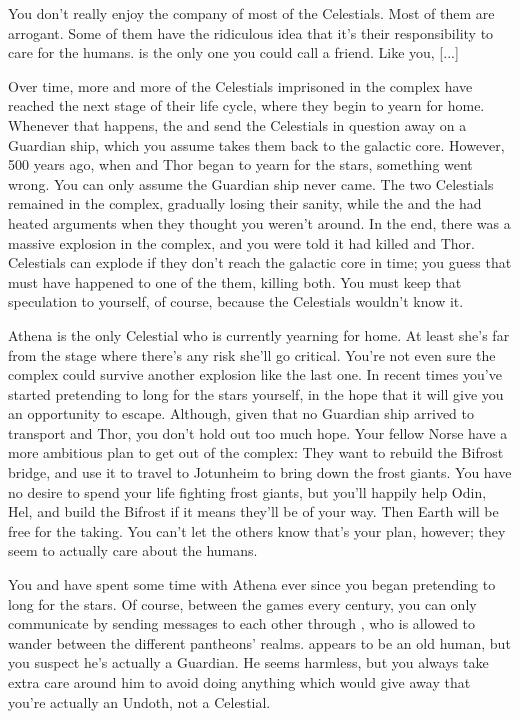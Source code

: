 \documentclass[char]{guardians}
\begin{document}
You don't really enjoy the company of most of the Celestials. Most of them are arrogant. Some of them have the ridiculous idea that it's their responsibility to care for the humans. \cAnubis{} is the only one you could call a friend. Like you, [...]

Over time, more and more of the Celestials imprisoned in the complex have reached the next stage of their life cycle, where they begin to yearn for home. Whenever that happens, the \cWarden{} and \cCaretaker{} send the Celestials in question away on a Guardian ship, which you assume takes them back to the galactic core. However, 500 years ago, when \cSet{} and Thor began to yearn for the stars, something went wrong. You can only assume the Guardian ship never came. The two Celestials remained in the complex, gradually losing their sanity, while the \cWarden{} and the \cCaretaker{} had heated arguments when they thought you weren't around. In the end, there was a massive explosion in the complex, and you were told it had killed \cSet{} and Thor. Celestials can explode if they don't reach the galactic core in time; you guess that must have happened to one of the them, killing both. You must keep that speculation to yourself, of course, because the Celestials wouldn't know it.

Athena is the only Celestial who is currently yearning for home. At least she's far from the stage where there's any risk she'll go critical. You're not even sure the complex could survive another explosion like the last one. In recent times you've started pretending to long for the stars yourself, in the hope that it will give you an opportunity to escape. Although, given that no Guardian ship arrived to transport \cSet{} and Thor, you don't hold out too much hope. Your fellow Norse have a more ambitious plan to get out of the complex: They want to rebuild the Bifrost bridge, and use it to travel to Jotunheim to bring down the frost giants. You have no desire to spend your life fighting frost giants, but you'll happily help Odin, Hel, and \cVal{} build the Bifrost if it means they'll be of your way. Then Earth will be free for the taking. You can't let the others know that's your plan, however; they seem to actually care about the humans.

You and \cVal{} have spent some time with Athena ever since you began pretending to long for the stars. Of course, between the games every century, you can only communicate by sending messages to each other through \cJascha{}, who is allowed to wander between the different pantheons' realms. \cJascha{} appears to be an old human, but you suspect he's actually a Guardian. He seems harmless, but you always take extra care around him to avoid doing anything which would give away that you're actually an Undoth, not a Celestial.
\end{document}
